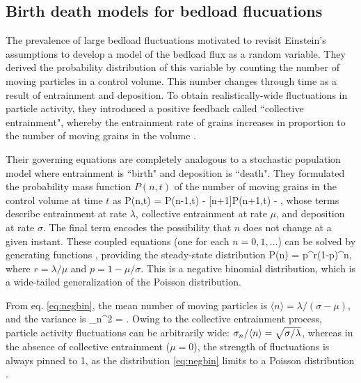 \subsection{Birth death models for bedload flucuations}

The prevalence of large bedload fluctuations motivated \citet{Ancey2006,Ancey2008} to revisit Einstein's assumptions to develop a model of the bedload flux as a random variable.
They derived the probability distribution of this variable by counting the number of moving particles in a control volume. 
This number changes through time as a result of entrainment and deposition.
To obtain realistically-wide fluctuations in particle activity, they introduced a positive feedback called ``collective entrainment", whereby the entrainment rate of grains increases in proportion to the number of moving grains in the volume \citep{Ancey2008,Heyman2013}.

Their governing equations are completely analogous to a stochastic population model \citep{Cox1965, Pielou1977} where entrainment is ``birth" and deposition is ``death".
They formulated the probability mass function $P(n,t)$ of the number of moving grains in the control volume at time $t$ as
\be \pt P(n,t) =  P(n-1,t) - [n+1]\sigma P(n+1,t) - ,\ee
whose terms describe entrainment at rate $\lambda$, collective entrainment at rate $\mu$, and deposition at rate $\sigma$. 
The final term encodes the possibility that $n$ does not change at a given instant.
These coupled equations (one for each $n=0,1,\dots$) can be solved by generating functions \citep{Cox1965,Ancey2008}, providing the steady-state distribution
\be P(n) = p^r(1-p)^n, \label{eq:negbin}\ee
where $r = \lambda/\mu$ and $p = 1-\mu/\sigma$.
This is a negative binomial distribution, which is a wide-tailed generalization of the Poisson distribution. 

From eq. \ref{eq:negbin}, the mean number of moving particles is $\langle n \rangle = \lambda/(\sigma-\mu)$, and the variance is
\be \sigma_n^2 = . \ee
Owing to the collective entrainment process, particle activity fluctuations can be arbitrarily wide: $\sigma_n/\langle n \rangle = \sqrt{\sigma/\lambda}$, whereas in the absence of collective entrainment ($\mu=0$), the strength of fluctuations is always pinned to 1, as the distribution \ref{eq:negbin} limits to a Poisson distribution \citep{Ancey2006}.

